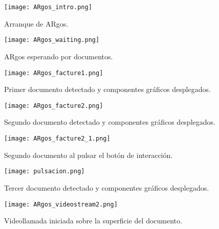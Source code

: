 \begin{figure}[!h]
  \begin{center}
    \texttt{[image: ARgos\_intro.png]}
    \caption{Arranque de ARgos.}
    \label{fig:ARgos_intro}
  \end{center}
\end{figure}

\begin{figure}[!h]
  \begin{center}
    \texttt{[image: ARgos\_waiting.png]}
    \caption{ARgos esperando por documentos.}
    \label{fig:ARgos_waiting}
  \end{center}
\end{figure}

\begin{figure}[!h]
  \begin{center}
    \texttt{[image: ARgos\_facture1.png]}
    \caption{Primer documento detectado y componentes gráficos desplegados.}
    \label{fig:ARgos_facture1}
  \end{center}
\end{figure}

\begin{figure}[!h]
  \begin{center}
    \texttt{[image: ARgos\_facture2.png]}
    \caption{Segundo documento detectado y componentes gráficos desplegados.}
    \label{fig:ARgos_facture2}
  \end{center}
\end{figure}

\begin{figure}[!h]
  \begin{center}
    \texttt{[image: ARgos\_facture2\_1.png]}
    \caption{Segundo documento al pulsar el botón de interacción.}
    \label{fig:ARgos_facture2_1}
  \end{center}
\end{figure}

\begin{figure}[!h]
  \begin{center}
    \texttt{[image: pulsacion.png]}
    \caption{Tercer documento detectado y componentes gráficos desplegados.}
    \label{fig:ARgos_facture3}
  \end{center}
\end{figure}

\begin{figure}[!h]
  \begin{center}
    \texttt{[image: ARgos\_videostream2.png]}
    \caption{Videollamada iniciada sobre la superficie del documento.}
    \label{fig:ARgos_videostream2}
  \end{center}
\end{figure}

